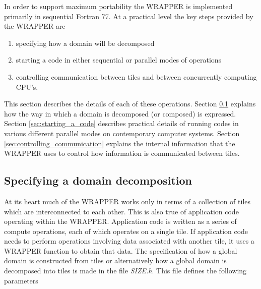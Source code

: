 In order to support maximum portability the WRAPPER is implemented primarily 
in sequential Fortran 77. At a practical level the key steps provided by the 
WRAPPER are
\begin{enumerate}
\item specifying how a domain will be decomposed
\item starting a code in either sequential or parallel modes of operations
\item controlling communication between tiles and between concurrently
computing CPU's.
\end{enumerate} 
This section describes the details of each of these operations.
Section \ref{sec:specifying_a_decomposition} explains how the way in which
a domain is decomposed (or composed) is expressed. Section 
\ref{sec:starting_a_code} describes practical details of running codes
in various different parallel modes on contemporary computer systems. 
Section \ref{sec:controlling_communication} explains the internal information
that the WRAPPER uses to control how information is communicated between
tiles.

\subsection{Specifying a domain decomposition}
\label{sec:specifying_a_decomposition}

At its heart much of the WRAPPER works only in terms of a collection of tiles
which are interconnected to each other. This is also true of application
code operating within the WRAPPER. Application code is written as a series
of compute operations, each of which operates on a single tile. If
application code needs to perform operations involving data
associated with another tile, it uses a WRAPPER function to obtain
that data.
The specification of how a global domain is constructed from tiles or alternatively
how a global domain is decomposed into tiles is made in the file {\em SIZE.h}.
This file defines the following parameters \\

 \\

